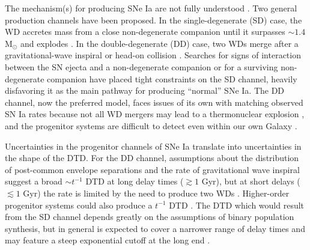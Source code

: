 \documentclass[twocolumn,twocolappendix,linenumbers,trackchanges]{aastex631}
\begin{document}
The mechanism(s) for producing SNe Ia are not fully understood \citep[for reviews, see][]{Maoz2014-Review,Livio2018-ProgenitorReview,Ruiter2020-ProgenitorReview}. Two general production channels have been proposed. In the single-degenerate (SD) case, the WD accretes mass from a close non-degenerate companion until it surpasses $\sim1.4$ M$_\odot$ and explodes \citep{Whelan1973-SDModel,Nomoto1982-SDModel,Yoon2003-SDModel}. In the double-degenerate (DD) case, two WDs merge after a gravitational-wave inspiral \citep{Iben1984-IaBinary,Webbink1984-DDModel,Pakmor2012-WDMerger} or head-on collision \citep{Benz1989-CollisionalDD,Thompson2011-CollisionalDD}. Searches for signs of interaction between the SN ejecta and a non-degenerate companion \citep[e.g.,][]{Panagia2006-RadioEmission,Chomiuk2016-RadioEmission,Fausnaugh2019-EarlyIaLightCurves,Tucker2020-SNeIaSpectra} or for a surviving non-degenerate companion \citep[e.g.,][]{Schaefer2012-ExCompanionSNR,Do2021-Progenitor1972E,Tucker2023-SN2011fe} have placed tight constraints on the SD channel, heavily disfavoring it as the main pathway for producing ``normal'' SNe Ia. The DD channel, now the preferred model, faces issues of its own with matching observed SN Ia rates because not all WD mergers may lead to a thermonuclear explosion \citep[e.g.,][]{NomotoIben1985-DDMergers,SaioNomoto1998-DDMergers,Shen2012-DDMergers}, and the progenitor systems are difficult to detect even within our own Galaxy \citep{RebassaMansergas2019-WhereAreDDProgenitors}.

Uncertainties in the progenitor channels of SNe Ia translate into uncertainties in the shape of the DTD. 
For the DD channel, assumptions about the distribution of post-common envelope separations and the rate of gravitational wave inspiral suggest a broad $\sim t^{-1}$ DTD at long delay times ($\gtrsim 1$ Gyr), but at short delays ($\lesssim 1$ Gyr) the rate is limited by the need to produce two WDs \citep[see Section 3.5 from][]{Maoz2014-Review}.
Higher-order progenitor systems could also produce a $t^{-1}$ DTD \citep{Fang2018-QuadrupleSystems,Rajamuthukumar2023-TripleEvolution}.
The DTD which would result from the SD channel depends greatly on the assumptions of binary population synthesis, but in general is expected to cover a narrower range of delay times and may feature a steep exponential cutoff at the long end \citep[e.g.,][]{Greggio2005-AnalyticalRates}.
\end{document}
